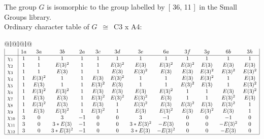 \documentclass[varwidth=\maxdimen,border=10]{standalone}
\begin{document}
The group $G$ is isomorphic to the group labelled by\ [ 36, 11 ]\ in the Small Groups library.\\
Ordinary character table of $G$\ $\cong$\ C3 x A4:\\
\begin{center}
\begin{tabular}{@{}l@{}l@{}l@{}}
\hline
\(\begin{array}{|l|cccccccccccc|}
  & 1a & 3a & 3b & 2a & 3c & 3d & 3e & 6a & 3f & 3g & 6b & 3h\\ \hline
\chi_{1} & 1 & 1 & 1 & 1 & 1 & 1 & 1 & 1 & 1 & 1 & 1 & 1\\
\chi_{2} & 1 & 1 & E(3)^{2} & 1 & 1 & E(3)^{2} & E(3) & E(3)^{2} & E(3)^{2} & E(3) & E(3) & E(3)\\
\chi_{3} & 1 & 1 & E(3) & 1 & 1 & E(3) & E(3)^{2} & E(3) & E(3) & E(3)^{2} & E(3)^{2} & E(3)^{2}\\
\chi_{4} & 1 & E(3)^{2} & 1 & 1 & E(3) & E(3)^{2} & 1 & 1 & E(3) & E(3)^{2} & 1 & E(3)\\
\chi_{5} & 1 & E(3) & 1 & 1 & E(3)^{2} & E(3) & 1 & 1 & E(3)^{2} & E(3) & 1 & E(3)^{2}\\
\chi_{6} & 1 & E(3)^{2} & E(3)^{2} & 1 & E(3) & E(3) & E(3) & E(3)^{2} & 1 & 1 & E(3) & E(3)^{2}\\
\chi_{7} & 1 & E(3) & E(3) & 1 & E(3)^{2} & E(3)^{2} & E(3)^{2} & E(3) & 1 & 1 & E(3)^{2} & E(3)\\
\chi_{8} & 1 & E(3)^{2} & E(3) & 1 & E(3) & 1 & E(3)^{2} & E(3) & E(3)^{2} & E(3) & E(3)^{2} & 1\\
\chi_{9} & 1 & E(3) & E(3)^{2} & 1 & E(3)^{2} & 1 & E(3) & E(3)^{2} & E(3) & E(3)^{2} & E(3) & 1\\
\chi_{10} & 3 & 0 & 3 & -1 & 0 & 0 & 3 & -1 & 0 & 0 & -1 & 0\\
\chi_{11} & 3 & 0 & 3*E(3) & -1 & 0 & 0 & 3*E(3)^{2} & -E(3) & 0 & 0 & -E(3)^{2} & 0\\
\chi_{12} & 3 & 0 & 3*E(3)^{2} & -1 & 0 & 0 & 3*E(3) & -E(3)^{2} & 0 & 0 & -E(3) & 0\\
\hline
\end{array}\)\\
\end{tabular}
\end{center}
\end{document}
